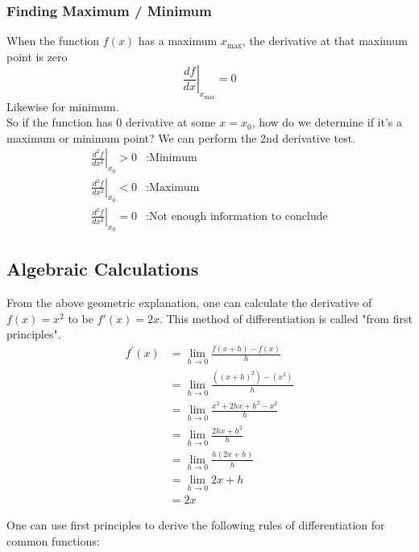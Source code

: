 \documentclass{article}
\begin{document}
\subsubsection{Finding Maximum / Minimum}
When the function $f(x)$ has a maximum $x_{\text{max}}$, the derivative at that maximum point is zero $$\left. \frac{df}{dx} \right|_{x_{\text{max}}} = 0$$
Likewise for minimum.\\[10pt]
So if the function has $0$ derivative at some $x=x_0$, how do we determine if it's a maximum or minimum point? We can perform the 2nd derivative test.\\

\begin{align}
    \left. \frac{d^2 f}{dx^2} \right|_{x_0} > 0 &: \text{Minimum}\\
    \left. \frac{d^2 f}{dx^2} \right|_{x_0} < 0 &: \text{Maximum}\\
    \left. \frac{d^2 f}{dx^2} \right|_{x_0} = 0 &: \text{Not enough information to conclude}
\end{align}

\subsection{Algebraic Calculations}
From the above geometric explanation, one can calculate the derivative of $f(x) = x^2$ to be $f'(x) = 2x$. This method of differentiation is called "from first principles".
\begin{align*}
f^{\prime}(x) & =\lim _{h \rightarrow 0} \frac{f(x+h)-f(x)}{h} \\
& =\lim _{h \rightarrow 0} \frac{\left((x+h)^2\right)-\left(x^2\right)}{h} \\
& =\lim _{h \rightarrow 0} \frac{x^2+2 h x+h^2-x^2}{h} \\
& =\lim _{h \rightarrow 0} \frac{2 h x+h^2}{h} \\
& =\lim _{h \rightarrow 0} \frac{h(2 x+h)}{h} \\
& =\lim _{h \rightarrow 0} 2 x+h \\
& =2 x
\end{align*}

One can use first principles to derive the following rules of differentiation for common functions:
\end{document}
